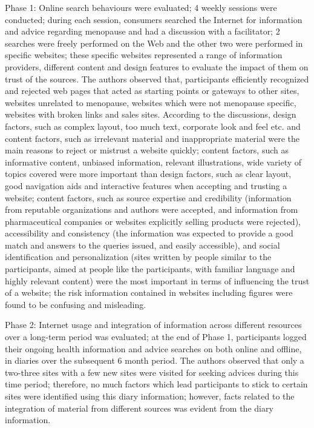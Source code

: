 \documentclass[]{article}
\begin{document}
Phase 1: Online search behaviours were evaluated; 4 weekly sessions were conducted; during each session, consumers searched the Internet for information and advice regarding menopause and had a discussion with a facilitator; 2 searches were freely performed on the Web and the other two were performed in specific websites; these specific websites represented a range of information providers, different content and design features to evaluate the impact of them on trust of the sources. The authors observed that, participants efficiently recognized and rejected web pages that acted as starting points or gateways to other sites, websites unrelated to menopause, websites which were not menopause specific, websites with broken links and sales sites. According to the discussions, design factors, such as complex layout, too much text, corporate look and feel etc. and content factors, such as irrelevant material and inappropriate material were the main reasons to reject or mistrust a website quickly; content factors, such as informative content, unbiased information, relevant illustrations, wide variety of topics covered were more important than design factors, such as clear layout, good navigation aids and interactive features when accepting and trusting a website; content factors, such as source expertise and credibility (information from reputable organizations and authors were accepted, and information from pharmaceutical companies or websites explicitly selling products were rejected), accessibility and consistency (the information was expected to provide a good match and answers to the queries issued, and easily accessible), and social identification and personalization (sites written by people similar to the participants, aimed at people like the participants, with familiar language and highly relevant content) were the most important in terms of influencing the trust of a website; the risk information contained in websites including figures were found to be confusing and misleading. 

Phase 2: Internet usage and integration of information across different resources over a long-term period was evaluated; at the end of Phase 1, participants logged their ongoing health information and advice searches on both online and offline, in diaries over the subsequent 6 month period. The authors observed that only a two-three sites with a few new sites were visited for seeking advices during this time period; therefore, no much factors which lead participants to stick to certain sites were identified using this diary information; however, facts related to the integration of material from different sources was evident from the diary information.   
\end{document}
